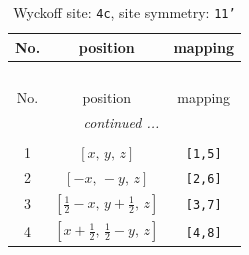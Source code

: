 \documentclass[fleqn,8pt]{jsarticle}
\begin{document}
\begin{longtable}{ccc}
\caption{Wyckoff site: {\tt 4c}, site symmetry: {\tt 11'}}
 \\
 \hline \hline
No. & position & mapping \\ \hline \endfirsthead

\multicolumn{2}{l}{\tablename\ \thetable{}} \\
 \hline \hline
No. & position & mapping \\ \hline \endhead

 \hline \hline
\multicolumn{2}{r}{\footnotesize\it continued ...} \\ \endfoot

 \hline \hline
\multicolumn{2}{r}{} \\ \endlastfoot

1 & $\left[ x,\, y,\, z \right]$ & {\tt [1,5]} \\ \hline
2 & $\left[ - x,\, - y,\, z \right]$ & {\tt [2,6]} \\ \hline
3 & $\left[ \frac{1}{2} - x,\, y + \frac{1}{2},\, z \right]$ & {\tt [3,7]} \\ \hline
4 & $\left[ x + \frac{1}{2},\, \frac{1}{2} - y,\, z \right]$ & {\tt [4,8]} \\
\end{longtable}
\end{document}
